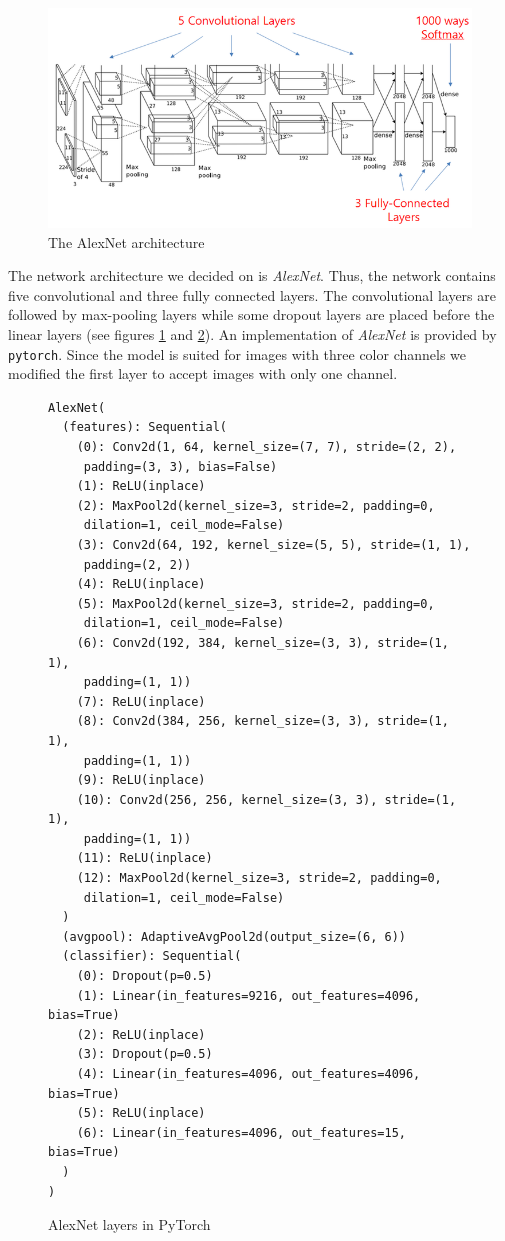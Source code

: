 \documentclass[12pt]{article}
\begin{document}
		\begin{figure}[h!]
			\includegraphics[width=\textwidth]{alexnet2.png}
			\caption{The AlexNet architecture}
			\label{fig:architecture}
		\end{figure}
		The network architecture we decided on is \textit{AlexNet}\cite{alexnet}. Thus, the network contains five convolutional and three fully connected layers. The convolutional layers are followed by max-pooling layers while some dropout layers are placed before the linear layers (see figures \ref{fig:architecture} and \ref{fig:layers}). An implementation of \textit{AlexNet} is provided by \texttt{pytorch}. Since the model is suited for images with three color channels we modified the first layer to accept images with only one channel.
		\begin{figure}[h!]
			\begin{lstlisting}
AlexNet(
  (features): Sequential(
    (0): Conv2d(1, 64, kernel_size=(7, 7), stride=(2, 2),
     padding=(3, 3), bias=False)
    (1): ReLU(inplace)
    (2): MaxPool2d(kernel_size=3, stride=2, padding=0,
     dilation=1, ceil_mode=False)
    (3): Conv2d(64, 192, kernel_size=(5, 5), stride=(1, 1),
     padding=(2, 2))
    (4): ReLU(inplace)
    (5): MaxPool2d(kernel_size=3, stride=2, padding=0,
     dilation=1, ceil_mode=False)
    (6): Conv2d(192, 384, kernel_size=(3, 3), stride=(1, 1),
     padding=(1, 1))
    (7): ReLU(inplace)
    (8): Conv2d(384, 256, kernel_size=(3, 3), stride=(1, 1),
     padding=(1, 1))
    (9): ReLU(inplace)
    (10): Conv2d(256, 256, kernel_size=(3, 3), stride=(1, 1),
     padding=(1, 1))
    (11): ReLU(inplace)
    (12): MaxPool2d(kernel_size=3, stride=2, padding=0,
     dilation=1, ceil_mode=False)
  )
  (avgpool): AdaptiveAvgPool2d(output_size=(6, 6))
  (classifier): Sequential(
    (0): Dropout(p=0.5)
    (1): Linear(in_features=9216, out_features=4096, bias=True)
    (2): ReLU(inplace)
    (3): Dropout(p=0.5)
    (4): Linear(in_features=4096, out_features=4096, bias=True)
    (5): ReLU(inplace)
    (6): Linear(in_features=4096, out_features=15, bias=True)
  )
)
		\end{lstlisting}
		\caption{AlexNet layers in PyTorch}
		\label{fig:layers}
		\end{figure}
		
\end{document}
